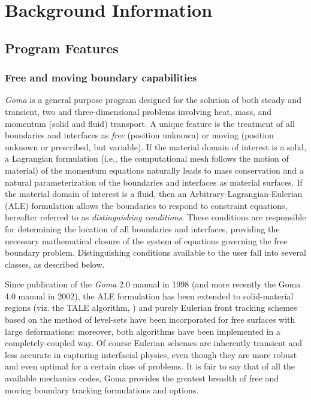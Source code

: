 \chapter{Background Information}
%
%
\section{Program Features}
%
%
\subsection{Free and moving boundary capabilities}
%
%
\emph{Goma} is a general purpose program designed for the solution of both steady and transient, two and three-dimensional problems involving heat, mass, and momentum (solid and fluid) transport. A unique feature is the treatment of all boundaries and interfaces as \emph{free} (position unknown) or moving (position unknown or prescribed, but variable). If the material domain of interest is a solid, a Lagrangian formulation (i.e., the computational mesh follows the motion of material) of the momentum equations naturally leads to mass conservation and a natural parameterization of the boundaries and interfaces as material surfaces. If the material domain of interest is a fluid, then an Arbitrary-Lagrangian-Eulerian (ALE) formulation allows the boundaries to respond to constraint equations, hereafter referred to as \emph{distinguishing conditions}. These conditions are responsible for determining the location of all boundaries and interfaces, providing the necessary mathematical closure of the system of equations governing the free boundary problem. Distinguishing conditions available to the user fall into several classes, as described below.

Since publication of the \emph{Goma} 2.0 manual in 1998 (and more recently the Goma 4.0 manual in 2002), the ALE formulation has been extended to solid-material regions (viz. the TALE algorithm, \citealt{TALE_SAND}) and purely Eulerian front tracking schemes based on the method of level-sets have been incorporated for free surfaces with large deformations; moreover, both algorithms have been implemented in a completely-coupled way. Of course Eulerian schemes are inherently transient and less accurate in capturing interfacial physics, even though they are more robust and even optimal for a certain class of problems. It is fair to say that of all the available mechanics codes, Goma provides the greatest breadth of free and moving boundary tracking formulations and options.


